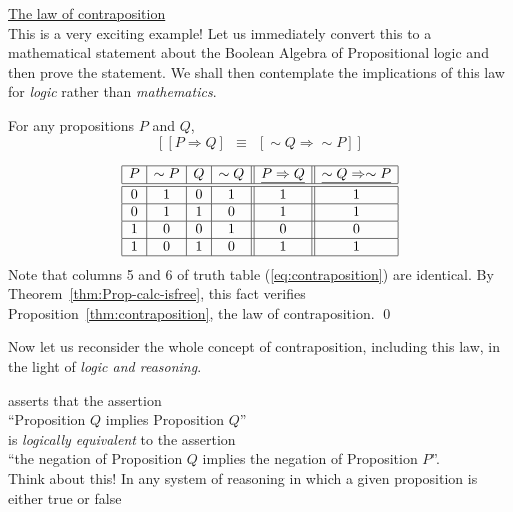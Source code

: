 \bigskip

\noindent 
\underline{\small\sf The law of contraposition} \\
This is a very exciting example!  Let us immediately convert this to a
mathematical statement about the Boolean Algebra of Propositional
logic and then prove the statement.  We shall then contemplate the
implications of this law for {\em logic} rather than {\em mathematics}.

\begin{prop}
\label{thm:contraposition}
For any propositions $P$ and $Q$,
\[  \left[ [ P \Rightarrow Q ] \ \ \equiv \ \ [ \sim Q
    \Rightarrow \sim P ] \right]
\]
\end{prop}

\begin{equation}
\label{eq:contraposition}
\begin{array}{|c|c|c|c||c||c|}
\hline
P & \sim P & Q & \sim Q & \underline{P \Rightarrow Q}
 & \underline{\sim Q \Rightarrow \sim P} \\
\hline
\hline
0 & 1 & 0 & 1 & 1 & 1 \\
\hline
0 & 1 & 1 & 0 & 1 & 1 \\
\hline
1 & 0 & 0 & 1 & 0 & 0 \\
\hline
1 & 0 & 1 & 0 & 1 & 1 \\
\hline
\end{array}
\end{equation}
Note that columns 5 and 6 of truth table (\ref{eq:contraposition}) are
identical.  By Theorem~\ref{thm:Prop-calc-isfree}, this fact verifies
Proposition~\ref{thm:contraposition}, the law of contraposition.
\qed

\smallskip

Now let us reconsider the whole concept of contraposition, including
this law, in the light of {\em logic and reasoning}.

 asserts that the assertion \\
\hspace*{.35in}
``Proposition $Q$ implies Proposition $Q$'' \\
is {\em logically equivalent} to the assertion \\
\hspace*{.35in}
``the negation of Proposition $Q$ implies the negation of Proposition
$P$''.  \\
Think about this!  In any system of reasoning in which a given
proposition is either {\sc true} or {\sc false} 






